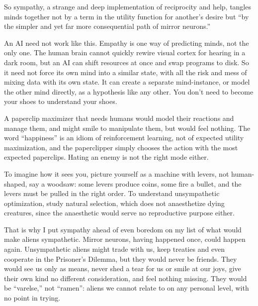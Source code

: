 So sympathy, a strange and deep implementation of reciprocity and help, tangles minds together not by a term in the utility function for another's desire but ``by the simpler and yet far more consequential path of mirror neurons.'' 

An AI need not work like this. Empathy is one way of predicting minds, not the only one. The human brain cannot quickly rewire visual cortex for hearing in a dark room, but an AI can shift resources at once and swap programs to disk. So it need not force its own mind into a similar state, with all the risk and mess of mixing data with its own state. It can create a separate mind-instance, or model the other mind directly, as a hypothesis like any other. You don't need to become your shoes to understand your shoes.

A paperclip maximizer that needs humans would model their reactions and manage them, and might smile to manipulate them, but would feel nothing. The word ``happiness'' is an idiom of reinforcement learning, not of expected utility maximization, and the paperclipper simply chooses the action with the most expected paperclips. Hating an enemy is not the right mode either.

To imagine how it sees you, picture yourself as a machine with levers, not human-shaped, say a woodsaw: some levers produce coins, some fire a bullet, and the levers must be pulled in the right order. To understand unsympathetic optimization, study natural selection, which does not anaesthetize dying creatures, since the anaesthetic would serve no reproductive purpose either.

That is why I put sympathy ahead of even boredom on my list of what would make aliens sympathetic. Mirror neurons, having happened once, could happen again. Unsympathetic aliens might trade with us, keep treaties and even cooperate in the Prisoner's Dilemma, but they would never be friends. They would see us only as means, never shed a tear for us or smile at our joys, give their own kind no different consideration, and feel nothing missing. They would be ``varelse,'' not ``ramen'': aliens we cannot relate to on any personal level, with no point in trying. 
